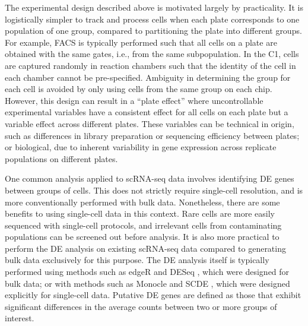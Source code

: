 \documentclass[oupdraft]{bio}
\begin{document}
The experimental design described above is motivated largely by practicality.
It is logistically simpler to track and process cells when each plate corresponds to one population of one group, compared to partitioning the plate into different groups.
For example, FACS is typically performed such that all cells on a plate are obtained with the same gates, i.e., from the same subpopulation.
In the C1, cells are captured randomly in reaction chambers such that the identity of the cell in each chamber cannot be pre-specified.
Ambiguity in determining the group for each cell is avoided by only using cells from the same group on each chip.
However, this design can result in a ``plate effect'' where uncontrollable experimental variables have a consistent effect for all cells on each plate but a variable effect across different plates. 
These variables can be technical in origin, such as differences in library preparation or sequencing efficiency between plates; 
    or biological, due to inherent variability in gene expression across replicate populations on different plates.


One common analysis applied to scRNA-seq data involves identifying DE genes between groups of cells.
This does not strictly require single-cell resolution, and is more conventionally performed with bulk data.
Nonetheless, there are some benefits to using single-cell data in this context.
Rare cells are more easily sequenced with single-cell protocols, and irrelevant cells from contaminating populations can be screened out before analysis.
It is also more practical to perform the DE analysis on existing scRNA-seq data compared to generating bulk data exclusively for this purpose.
The DE analysis itself is typically performed using methods such as edgeR \citep{robinson2010edgeR} and DESeq \citep{anders2010differential}, which were designed for bulk data;
    or with methods such as Monocle \citep{trapnell2014dynamics} and SCDE \citep{kharchenko2014bayesian}, which were designed explicitly for single-cell data.
Putative DE genes are defined as those that exhibit significant differences in the average counts between two or more groups of interest.
\end{document}
